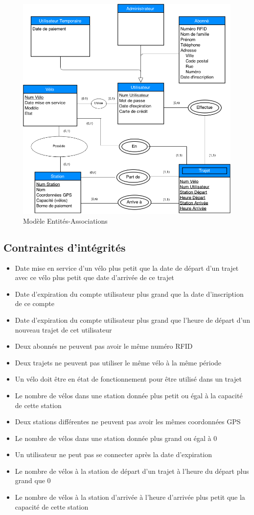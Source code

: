 \documentclass[a4paper,11pt]{report}
\begin{document}
\begin{figure}[H]
\includegraphics[scale=0.45]{MEA.png}
\centering
\caption{Modèle Entités-Associations}
\end{figure}

\subsection{Contraintes d'intégrités}
\begin{itemize}
\item Date mise en service d'un vélo plus petit que la date de départ d'un trajet avec ce vélo plus petit que date d'arrivée de ce trajet
\item Date d'expiration du compte utilisateur plus grand que la date d'inscription de ce compte
\item Date d'expiration du compte utilisateur plus grand que l'heure de départ d'un nouveau trajet de cet utilisateur
\item Deux abonnés ne peuvent pas avoir le même numéro RFID
\item Deux trajets ne peuvent pas utiliser le même vélo à la même période
\item Un vélo doit être en état de fonctionnement pour être utilisé dans un trajet
\item Le nombre de vélos dans une station donnée plus petit ou égal à la capacité de cette station
\item Deux stations différentes ne peuvent pas avoir les mêmes coordonnées GPS
\item Le nombre de vélos dans une station donnée plus grand ou égal à 0
\item Un utilisateur ne peut pas se connecter après la date d'expiration
\item Le nombre de vélos à la station de départ d'un trajet à l'heure du départ plus grand que 0
\item Le nombre de vélos à la station d'arrivée à l'heure d'arrivée plus petit que la capacité de cette station
\end{itemize}
\pagebreak
\end{document}
